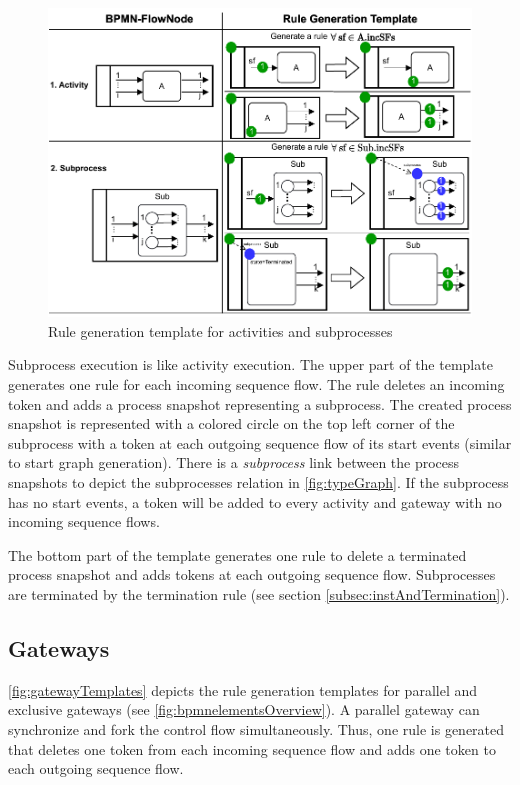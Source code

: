 \documentclass[runningheads]{llncs}
\begin{document}
\begin{figure}[ht]
    \centering
    \includegraphics[width=1\textwidth]{images/activities_template.pdf}
    \caption{Rule generation template for activities and subprocesses}
    \label{fig:activityTemplates}
\end{figure}

Subprocess execution is like activity execution.
The upper part of the template generates one rule for each incoming sequence flow.
The rule deletes an incoming token and adds a process snapshot representing a subprocess. 
The created process snapshot is represented with a colored circle on the top left corner of the subprocess with a token at each outgoing sequence flow of its start events (similar to start graph generation).
There is a \textit{subprocess} link between the process snapshots to depict the \textsf{subprocesses} relation in \autoref{fig:typeGraph}.
If the subprocess has no start events, a token will be added to every activity and gateway with no incoming sequence flows.

The bottom part of the template generates one rule to delete a terminated process snapshot and adds tokens at each outgoing sequence flow.
Subprocesses are terminated by the termination rule (see section \ref{subsec:instAndTermination}).


\subsection{Gateways}
\autoref{fig:gatewayTemplates} depicts the rule generation templates for parallel and exclusive gateways (see \autoref{fig:bpmnelementsOverview}).
A parallel gateway can synchronize and fork the control flow simultaneously.
Thus, one rule is generated that deletes one token from each incoming sequence flow and adds one token to each outgoing sequence flow.
\end{document}
